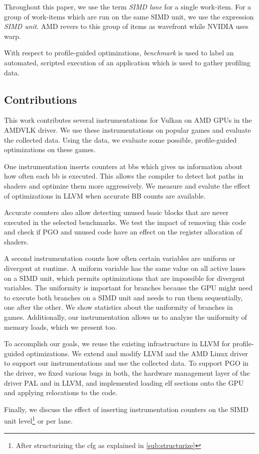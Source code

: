 Throughout this paper, we use the term \emph{SIMD lane} for a single work-item.
For a group of work-items which are run on the same SIMD unit, we use the expression \emph{SIMD unit}.
AMD revers to this group of items as wavefront while NVIDIA uses warp.

With respect to profile-guided optimizations, \emph{benchmark} is used to label an automated, scripted execution of an application which is used to gather profiling data.


\subsection{Contributions}
\label{sub:contributions}
This work contributes several instrumentations for Vulkan on AMD GPUs in the AMDVLK driver.
We use these instrumentations on popular games and evaluate the collected data. Using the data, we evaluate some possible, profile-guided optimizations on these games.

One instrumentation inserts counters at \glspl{bb} which gives us information about how often each \gls{bb} is executed. This allows the compiler to detect hot paths in shaders and optimize them more aggressively. We measure and evalute the effect of optimizations in LLVM when accurate BB counts are available.

Accurate counters also allow detecting unused basic blocks that are never executed in the selected benchmarks. We test the impact of removing this code and check if PGO and unused code have an effect on the register allocation of shaders.

A second instrumentation counts how often certain variables are uniform or divergent at runtime. A uniform variable has the same value on all active lanes on a SIMD unit, which permits optimizations that are impossible for divergent variables.
The uniformity is important for branches because the GPU might need to execute both branches on a SIMD unit and needs to run them sequentially, one after the other.
We show statistics about the uniformity of branches in games.
Additionally, our instrumentation allows us to analyze the uniformity of memory loads, which we present too.

To accomplish our goals, we reuse the existing infrastructure in LLVM for profile-guided optimizations.
We extend and modify LLVM and the AMD Linux driver to support our instrumentations and use the collected data.
To support PGO in the driver, we fixed various bugs in both, the hardware management layer of the driver PAL and in LLVM, and implemented loading \gls{elf} sections onto the GPU and applying relocations to the code.

Finally, we discuss the effect of inserting instrumentation counters on the SIMD unit level\footnote{After structurizing the \gls{cfg} as explained in \cref{sub:structurize}} or per lane.
